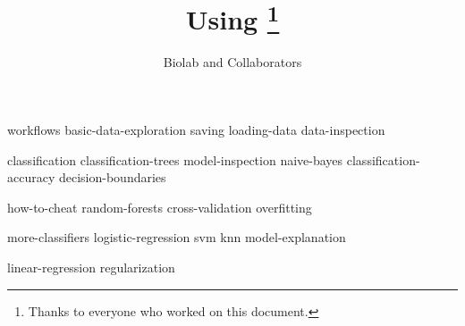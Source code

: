 \documentclass[symmetric, justified, a4paper]{tufte-book}
\title{Using \mutation\thanks{Thanks to everyone who worked on this document.}}
\author[Biolab and Collaborators]{Biolab and Collaborators}
\begin{document}
\frontmatter

\maketitle



\tableofcontents

%

\mainmatter



{workflows}
{basic-data-exploration}
{saving}
{loading-data}
{data-inspection}


{classification}
{classification-trees}
{model-inspection}
{naive-bayes}
{classification-accuracy}
{decision-boundaries}

{how-to-cheat}
{random-forests}
{cross-validation}
{overfitting}


{more-classifiers}
{logistic-regression}
{svm}
{knn}
{model-explanation}


{linear-regression}
{regularization}
\end{document}
